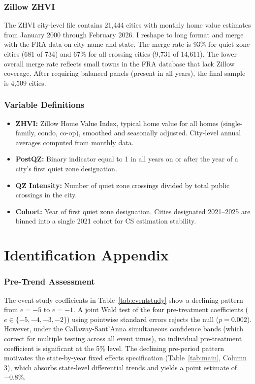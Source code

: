 \documentclass[12pt]{article}
\begin{document}
\subsubsection*{Zillow ZHVI} The ZHVI city-level file contains 21,444 cities with monthly home value estimates from January 2000 through February 2026. I reshape to long format and merge with the FRA data on city name and state. The merge rate is 93\% for quiet zone cities (681 of 734) and 67\% for all crossing cities (9,731 of 14,611). The lower overall merge rate reflects small towns in the FRA database that lack Zillow coverage. After requiring balanced panels (present in all years), the final sample is 4,509 cities.

\subsubsection*{Variable Definitions}
\begin{itemize}
\item \textbf{ZHVI:} Zillow Home Value Index, typical home value for all homes (single-family, condo, co-op), smoothed and seasonally adjusted. City-level annual averages computed from monthly data.
\item \textbf{PostQZ:} Binary indicator equal to 1 in all years on or after the year of a city's first quiet zone designation.
\item \textbf{QZ Intensity:} Number of quiet zone crossings divided by total public crossings in the city.
\item \textbf{Cohort:} Year of first quiet zone designation. Cities designated 2021--2025 are binned into a single 2021 cohort for CS estimation stability.
\end{itemize}


\section{Identification Appendix}

\subsubsection*{Pre-Trend Assessment} The event-study coefficients in Table~\ref{tab:eventstudy} show a declining pattern from $e = -5$ to $e = -1$. A joint Wald test of the four pre-treatment coefficients ($e \in \{-5, -4, -3, -2\}$) using pointwise standard errors rejects the null ($p = 0.002$). However, under the Callaway-Sant'Anna simultaneous confidence bands (which correct for multiple testing across all event times), no individual pre-treatment coefficient is significant at the 5\% level. The declining pre-period pattern motivates the state-by-year fixed effects specification (Table~\ref{tab:main}, Column 3), which absorbs state-level differential trends and yields a point estimate of $-0.8\%$.
\end{document}
